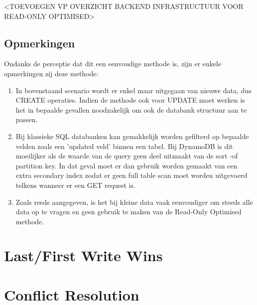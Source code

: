 <TOEVOEGEN VP OVERZICHT BACKEND INFRASTRUCTUUR VOOR READ-ONLY OPTIMISED>

\subsection{Opmerkingen}
Ondanks de perceptie dat dit een eenvoudige methode is, zijn er enkele opmerkingen zij deze methode:
\begin{enumerate}
\item In bovenstaand scenario wordt er enkel maar uitgegaan van nieuwe data, dus CREATE operaties. Indien de methode ook voor UPDATE moet werken is het in bepaalde gevallen noodzakelijk om ook de databank structuur aan te passen.
\item Bij klassieke SQL databanken kan gemakkelijk worden gefilterd op bepaalde velden zoals een 'updated veld' binnen een tabel. Bij DynamoDB is dit moeilijker als de waarde van de query geen deel uitmaakt van de sort -of partition key. In dat geval moet er dan gebruik worden gemaakt van een extra secondary index zodat er geen full table scan moet worden uitgevoerd telkens wanneer er een GET request is.
\item Zoals reeds aangegeven, is het bij kleine data vaak eenvoudiger om steeds alle data op te vragen en geen gebruik te maken van de Read-Only Optimised methode.
\end{enumerate}

\section{Last/First Write Wins}
\section{Conflict Resolution}
